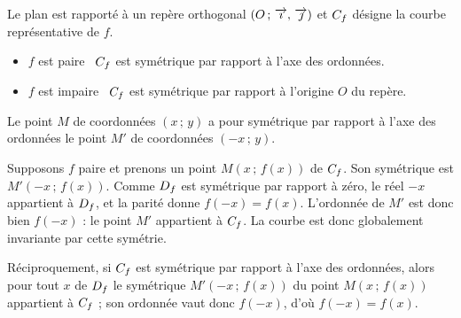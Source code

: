 \begin{theoreme}
Le plan est rapporté à un repère orthogonal $\left(O\,;\,\overrightarrow{\imath},\,\overrightarrow{\jmath}\right)$ et $C_{f}$ désigne la
courbe représentative de $f$.
\begin{itemize}[leftmargin=1.6em, itemsep=0.2em]
  \item $f$ est paire \ssi\ $C_{f}$ est symétrique par rapport à l'axe des
        ordonnées.
  \item $f$ est impaire \ssi\ $C_{f}$ est symétrique par rapport à
        l'origine $O$ du repère.
\end{itemize}
\end{theoreme}

\begin{demonstration}
Le point $M$ de coordonnées $(x\,;\,y)$ a pour symétrique par rapport à l'axe
des ordonnées le point $M'$ de coordonnées $(-x\,;\,y)$.

Supposons $f$ paire et prenons un point $M(x\,;\,f(x))$ de $C_{f}$. Son
symétrique est $M'(-x\,;\,f(x))$. Comme $D_{f}$ est symétrique par rapport
à zéro, le réel $-x$ appartient à $D_{f}$, et la parité donne
$f(-x) = f(x)$. L'ordonnée de $M'$ est donc bien $f(-x)$ : le point $M'$
appartient à $C_{f}$. La courbe est donc globalement invariante par cette
symétrie.

Réciproquement, si $C_{f}$ est symétrique par rapport à l'axe des
ordonnées, alors pour tout $x$ de $D_{f}$ le symétrique
$M'(-x\,;\,f(x))$ du point $M(x\,;\,f(x))$ appartient à $C_{f}$ ; son
ordonnée vaut donc $f(-x)$, d'où $f(-x) = f(x)$.
\end{demonstration}

